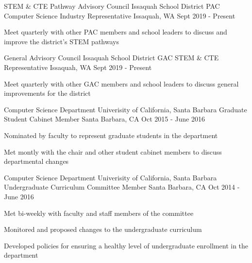 \begin{cventries}

\cventry
    {STEM \& CTE Pathway Advisory Council \newline Issaquah School District}
    {PAC Computer Science Industry Representative}
    {Issaquah, WA}
    {Sept 2019 - Present}
    {
      \begin{cvitems}
	\item{Meet quarterly with other PAC members and school leaders to discuss and improve the district's STEM pathways}
      \end{cvitems}
    }

\cventry
    {General Advisory Council \newline Issaquah School District}
    {GAC STEM \& CTE Representative}
    {Issaquah, WA}
    {Sept 2019 - Present}
    {
      \begin{cvitems}
	\item{Meet quarterly with other GAC members and school leaders to discuss general improvements for the district}
      \end{cvitems}
    }

\cventry
    {Computer Science Department \newline Univerisity of California, Santa Barbara}
    {Graduate Student Cabinet Member}
    {Santa Barbara, CA}
    {Oct 2015 - June 2016}
    {
      \begin{cvitems}
	\item{Nominated by faculty to represent graduate students in the department}
        \item {Met montly with the chair and other student cabinet members to discuss departmental changes}
      \end{cvitems}
    }

  \cventry
    {Computer Science Department \newline Univerisity of California, Santa Barbara}
    {Undergraduate Curriculum Committee Member}
    {Santa Barbara, CA}
    {Oct 2014 - June 2016}
    {
      \begin{cvitems}
	\item{Met bi-weekly with faculty and staff members of the committee}
        \item {Monitored and proposed changes to the undergraduate curriculum}
        \item {Developed policies for ensuring a healthy level of undergraduate enrollment in the department}
      \end{cvitems}
    }


\end{cventries}
